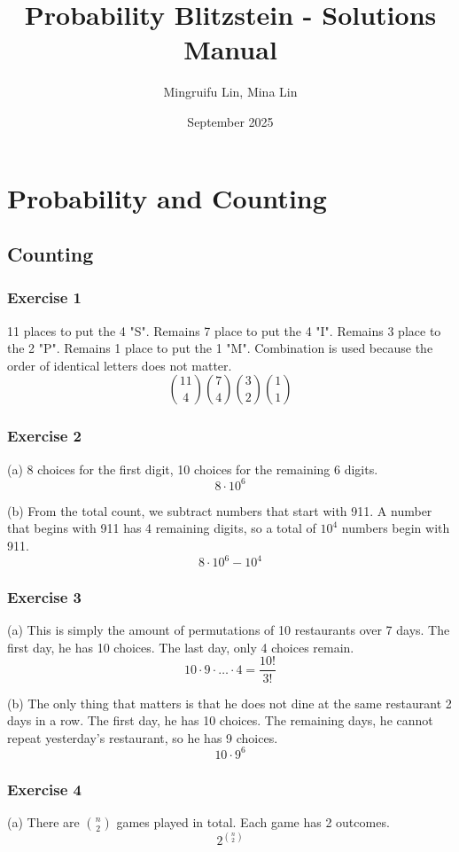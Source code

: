\documentclass{book}
\title{Probability Blitzstein - Solutions Manual}
\author{Mingruifu Lin, Mina Lin}
\date{September 2025}
\begin{document}
\maketitle

\tableofcontents

\chapter{Probability and Counting}

\section{Counting}

\subsection*{Exercise 1}
11 places to put the 4 "S". Remains 7 place to put the 4 "I". Remains 3 place to the 2 "P". Remains 1 place to put the 1 "M". Combination is used because the order of identical letters does not matter.
$$\binom{11}{4} \binom{7}{4} \binom{3}{2} \binom{1}{1}$$

\subsection*{Exercise 2}
(a) 8 choices for the first digit, 10 choices for the remaining 6 digits.
$$8 \cdot 10^6$$

\noindent
(b) From the total count, we subtract numbers that start with 911. A number that begins with 911 has 4 remaining digits, so a total of $10^4$ numbers begin with 911.
$$8 \cdot 10^6 - 10^4$$

\subsection*{Exercise 3}
(a) This is simply the amount of permutations of 10 restaurants over 7 days. The first day, he has 10 choices. The last day, only 4 choices remain.
$$10 \cdot 9 \cdot \ldots \cdot 4 = \frac{10!}{3!}$$

\noindent
(b) The only thing that matters is that he does not dine at the same restaurant 2 days in a row. The first day, he has 10 choices. The remaining days, he cannot repeat yesterday's restaurant, so he has 9 choices.
$$10 \cdot 9^6$$

\subsection*{Exercise 4}
(a) There are $\binom{n}{2}$ games played in total. Each game has 2 outcomes.
$$2^{\binom{n}{2}}$$
\end{document}

